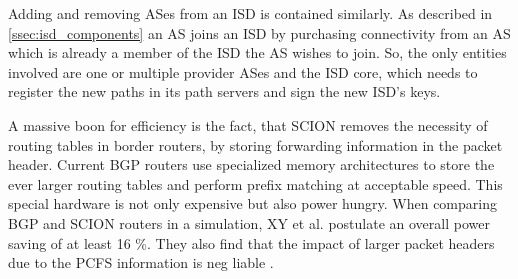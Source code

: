 \documentclass[../eva1_scion.tex]{subfiles}
\begin{document}
    Adding and removing ASes from an ISD is contained similarly. As described in \ref{ssec:isd_components} an AS joins an ISD by purchasing connectivity from an AS which is already a member of the ISD the AS wishes to join. So, the only entities involved are one or multiple provider ASes and the ISD core, which needs to register the new paths in its path servers and sign the new ISD's keys.

    A massive boon for efficiency is the fact, that SCION removes the necessity of routing tables in border routers, by storing forwarding information in the packet header. Current BGP routers use specialized memory architectures to store the ever larger routing tables and perform prefix matching at acceptable speed. This special hardware is not only expensive but also power hungry. When comparing BGP and SCION routers in a simulation, XY et al. postulate an overall power saving of at least 16 \%. They also find that the impact of larger packet headers due to the PCFS information is neg liable \cite{scion_power}.
\end{document}
